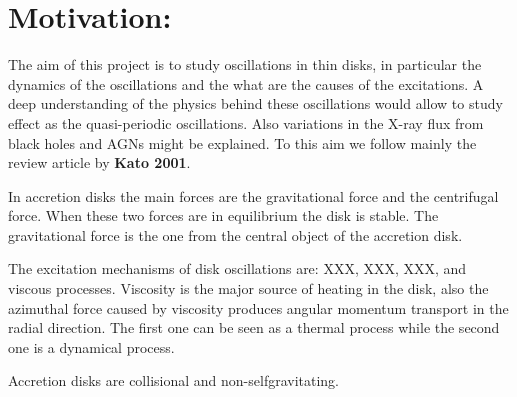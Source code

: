 \documentclass[12pt]{article}
\begin{document}
\section*{Motivation:}

The aim of this project is to study oscillations in thin disks, in
particular the dynamics of the oscillations and the what are the
causes of the excitations. A deep understanding of the physics behind
these oscillations would allow to study effect as the quasi-periodic
oscillations. Also variations in the X-ray flux from black holes and
AGNs might be explained. To this aim we follow mainly the review
article by \textbf{Kato 2001}.

In accretion disks the main forces are the gravitational force and the
centrifugal force. When these two forces are in equilibrium the disk
is stable. The gravitational force is the one from the central object
of the accretion disk.

The excitation mechanisms of disk oscillations are: XXX, XXX, XXX, and viscous
processes. Viscosity is the major source of heating in the disk, also
the azimuthal force caused by viscosity produces angular momentum
transport in the radial direction. The first one can be seen as a
thermal process while the second one is a dynamical process.

Accretion disks are collisional and non-selfgravitating.
\end{document}
